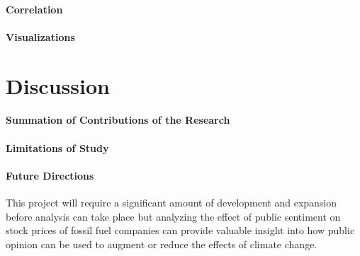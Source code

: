 \documentclass[12pt]{article}
\begin{document}
\paragraph{Correlation}
\paragraph{Visualizations}

\section{Discussion}
\paragraph{Summation of Contributions of the Research}
\paragraph{Limitations of Study}
\paragraph{Future Directions}
This project will require a significant amount of development and expansion before analysis can take place but analyzing the effect of public sentiment on stock prices of fossil fuel companies can provide valuable insight into how public opinion can be used to augment or reduce the effects of climate change.


%
%
\end{document}
